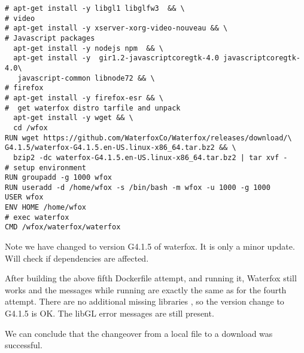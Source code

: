 \documentclass{article}  %
\begin{document}
\begin{verbatim}
# apt-get install -y libgl1 libglfw3  && \
# video
# apt-get install -y xserver-xorg-video-nouveau && \
# Javascript packages
  apt-get install -y nodejs npm  && \
  apt-get install -y  gir1.2-javascriptcoregtk-4.0 javascriptcoregtk-4.0\
   javascript-common libnode72 && \
# firefox
# apt-get install -y firefox-esr && \
#  get waterfox distro tarfile and unpack
  apt-get install -y wget && \
  cd /wfox 
RUN wget https://github.com/WaterfoxCo/Waterfox/releases/download/\
G4.1.5/waterfox-G4.1.5.en-US.linux-x86_64.tar.bz2 && \
  bzip2 -dc waterfox-G4.1.5.en-US.linux-x86_64.tar.bz2 | tar xvf -
# setup environment
RUN groupadd -g 1000 wfox
RUN useradd -d /home/wfox -s /bin/bash -m wfox -u 1000 -g 1000
USER wfox
ENV HOME /home/wfox
# exec waterfox
CMD /wfox/waterfox/waterfox
\end{verbatim}
Note we have changed to version G4.1.5 of waterfox. It is only a minor update. Will check if dependencies are affected.

After building the above fifth Dockerfile attempt, and running it, Waterfox still works and the messages while running are exactly the same as for the fourth attempt. There are no additional missing libraries , so the version change to G4.1.5 is OK. The libGL error messages are still present. 

We can conclude that the changeover from a local file to a download was successful.
\end{document}
